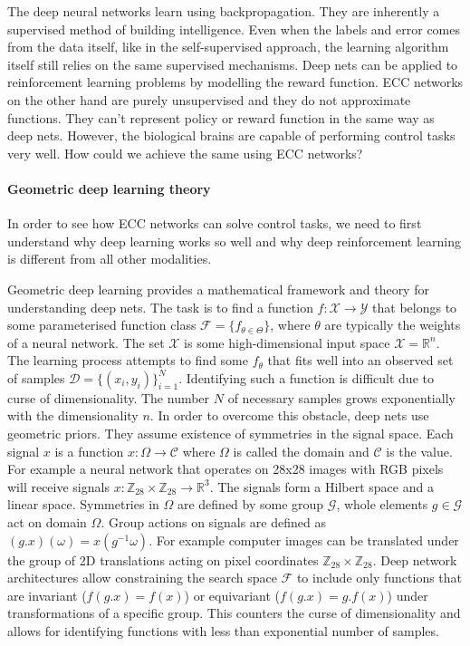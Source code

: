 \documentclass[12pt]{article}
\begin{document}
The deep neural networks learn using backpropagation. They are inherently a supervised method of building intelligence. Even when the labels and error comes from the data itself, like in the self-supervised approach, the learning algorithm itself still relies on the same supervised mechanisms. Deep nets can be applied to reinforcement learning problems by modelling the reward function. ECC networks on the other hand are purely unsupervised and they do not approximate functions. They can't represent policy or reward function in the same way as deep nets. However, the biological brains are capable of performing control tasks very well. How could we achieve the same using ECC networks?


\paragraph{Geometric deep learning theory}

In order to see how ECC networks can solve control tasks, we need to first understand why deep learning works so well and why deep reinforcement learning is different from all other modalities. 

Geometric deep learning provides a mathematical framework and theory for understanding deep nets. The task is to find a function $f:\mathcal{X}\rightarrow\mathcal{Y}$ that belongs to some parameterised function class $\mathcal{F}=\{f_{\theta \in \Theta}\}$, where $\theta$ are typically the weights of a neural network. The set $\mathcal{X}$ is some high-dimensional input space $\mathcal{X}=\mathbb{R}^n$. The learning process attempts to find some $f_\theta$ that fits well into an observed set of samples $\mathcal{D}=\{(x_i,y_i)\}_{i=1}^N$. Identifying such a function is difficult due to curse of dimensionality. The number $N$ of necessary samples grows exponentially with the dimensionality $n$. In order to overcome this obstacle, deep nets use geometric priors. They assume existence of symmetries in the signal space. Each signal $x$ is a function $x:\Omega \rightarrow \mathcal{C}$ where $\Omega$ is called the domain and $\mathcal{C}$ is the value.
For example a neural network that operates on 28x28 images with RGB pixels will receive signals $x:\mathbb{Z}_{28}\times \mathbb{Z}_{28} \rightarrow \mathbb{R}^{3}$. The signals form a Hilbert space and a linear space. Symmetries in $\Omega$ are defined by some group $\mathcal{G}$, whole elements $g\in \mathcal{G}$ act on domain $\Omega$. Group actions on signals are defined as $(g.x)(\omega)=x(g^{-1}\omega)$. For example computer images can be translated under the group of 2D translations acting on pixel coordinates $\mathbb{Z}_{28}\times \mathbb{Z}_{28}$. Deep network architectures allow constraining the search space $\mathcal{F}$ to include only functions that are invariant ($f(g.x)=f(x)$) or equivariant ($f(g.x)=g.f(x)$) under transformations of a specific group. This counters the curse of dimensionality and allows for identifying functions with less than exponential number of samples.
\end{document}
